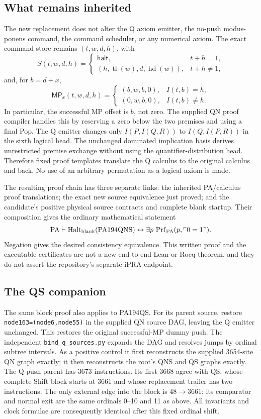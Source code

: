 \subsection{What remains inherited}
The new replacement does not alter the Q axiom emitter, the no-push
modus-ponens command, the command scheduler, or any numerical axiom.
The exact command store remains $(t,w,d,h)$, with
\[
 S(t,w,d,h)=
 \begin{cases}\mathsf{halt},&t+h=1,\\
 (h,\operatorname{tl}(w),d,\operatorname{hd}(w)),&t+h\ne1,
 \end{cases}
\]
and, for $b=d+x$,
\[
 \mathsf{MP}_x(t,w,d,h)=
 \begin{cases}(b,w,b,0),&I(t,b)=h,\\(0,w,b,0),&I(t,b)\ne h.
 \end{cases}
\]
In particular, the successful MP offset is $b$, not zero.
The supplied QN proof compiler handles this by reserving a zero below
the two premises and using a final Pop.  The Q emitter changes only
$I(P,I(Q,R))$ to $I(Q,I(P,R))$ in the sixth logical head.
The unchanged dominated implication basis derives unrestricted premise
exchange without using the quantifier-distribution head.  Therefore
fixed proof templates translate the Q calculus to the original calculus
and back.  No use of an arbitrary permutation as a logical axiom is made.

The resulting proof chain has three separate links: the inherited
PA/calculus proof translations; the exact new source equivalence just
proved; and the candidate's positive physical source contracts and
complete blank startup.  Their composition gives the ordinary
mathematical statement
\[
 \mathrm{PA}\vdash
 \operatorname{Halt}_{\rm blank}(\mathrm{PA194QNS})
 \leftrightarrow
 \exists p\,\operatorname{Prf}_{\mathrm{PA}}(p,\ulcorner0=1\urcorner).
\]
Negation gives the desired consistency equivalence.  This written proof
and the executable certificates are not a new end-to-end Lean or Rocq
theorem, and they do not assert the repository's separate iPRA endpoint.

\subsection{The QS companion}
The same block proof also applies to PA194QS.  For its parent source,
restore \texttt{node163=(node6,node55)} in the supplied QN source DAG,
leaving the Q emitter unchanged.  This restores the original successful-MP
dummy push.  The independent \texttt{bind\_q\_sources.py} expands the DAG
and resolves jumps by ordinal subtree intervals.  As a positive control
it first reconstructs the supplied 3654-site QN graph exactly; it then
reconstructs the root's QNS and QS graphs exactly.  The Q-push parent has
3673 instructions.  Its first 3668 agree with QS, whose complete Shift
block starts at 3661 and whose replacement trailer has two instructions.
The only external edge into the block is $48\to3661$; its comparator and
normal exit are the same ordinals 0--10 and 11 as above.  All invariants
and clock formulae are consequently identical after this fixed ordinal shift.

